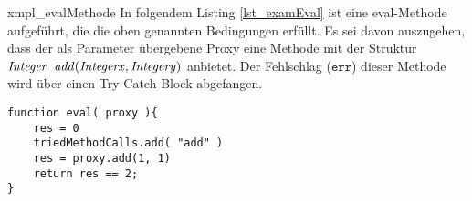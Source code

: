 \begin{example}{xmpl_evalMethode}
In folgendem Listing \ref{lst_examEval} ist eine eval-Methode aufgeführt, die die oben genannten Bedingungen erfüllt. Es sei davon auszugehen, dass der als Parameter übergebene Proxy eine Methode mit der Struktur $\mathit{Integer}\texttt{ }\mathit{add(Integer x, Integer y)}$
anbietet. Der Fehlschlag ($\texttt{err}$) dieser Methode wird über einen Try-Catch-Block abgefangen.
\begin{lstlisting}[style = pseudo, label = lst_examEval, caption = Beispielhafte Implementierung einer eval-Methode, captionpos = b]
function eval( proxy ){
	res = 0	
	triedMethodCalls.add( "add" )
	res = proxy.add(1, 1)
	return res == 2;
}
\end{lstlisting}
\end{example}

